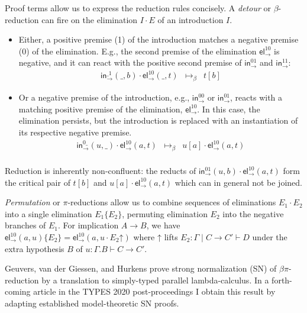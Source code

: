 \documentclass[a4paper]{easychair}
\newcommand{\tin}{\ensuremath{\mathsf{in}}}
\newcommand{\inn}[2]{\ensuremath{\tin_{#1}^{#2}}}
\newcommand{\tel}{\mathsf{el}}
\newcommand{\el}[2]{\ensuremath{\tel_{#1}^{#2}}}
\newcommand{\contract}[1][]{\mapsto_{#1}}
\newcommand{\up}{\mathord{\uparrow}}
\begin{document}
Proof terms allow us to express the reduction rules concisely.  A
\emph{detour} or $\beta$-reduction can fire on the elimination $I
\cdot E$ of an introduction $I$.
\begin{itemize}
\item
Either, a
positive premise (1) of the introduction matches a negative premise
(0) of the elimination.  E.g., the second
premise of the elimination $\el\to{10}$
is negative, and it can react with the
positive second premise of $\inn\to{01}$ and $\inn\to{11}$:
\[
\begin{array}{lll}
  \inn\to{\_1}(\_,b) \cdot \el\to{10}(\_,t)
    & \contract[\beta] &
  t[b]
\end{array}
\]

\item
Or a negative premise of the introduction, e.g., $\inn\to{00}$ or
$\inn\to{01}$, reacts with
a matching positive premise of the elimination, $\el\to{10}$.
In this case, the
elimination persists, but the introduction is replaced with an
instantiation of its respective negative premise.
\[
\begin{array}{lll}
  \inn\to{0\_}(u,\_) \cdot \el\to{10}(a,t)
    & \contract[\beta] &
  u[a] \cdot \el\to{10}(a,t)
\\
\end{array}
\]
\end{itemize}
Reduction is inherently non-confluent: the reducts of
$\inn\to{01}(u,b) \cdot \el\to{10}(a,t)$ form the critical pair
of $t[b]$ and  $u[a] \cdot \el\to{10}(a,t)$ which can in general not be
joined.

\emph{Permutation} or $\pi$-reductions allow us to combine sequences
of eliminations $E_1 \cdot E_2$ into a single elimination
$E_1\{E_2\}$, permuting elimination $E_2$ into the negative branches
of $E_1$.  For implication $A \to B$, we have $\el\to{10}(a,u) \{ E_2 \} =
\el\to{10}(a,u \cdot E_2 \up)$ where $\up$ lifts $E_2 : \Gamma \mid C
\to C' \vdash D$ under the extra hypothesis $B$ of $u : \Gamma.B \vdash
C \to C'$.

Geuvers, van der Giessen, and Hurkens
\citeyearpar{geuversGiessenHurkens:fundinf19} prove strong normalization (SN)
of $\beta\pi$-reduction by a translation to simply-typed parallel
lambda-calculus.  In a forth-coming article \citep{abel:types20post}
in the TYPES 2020
post-proceedings I obtain this result by adapting established
model-theoretic SN proofs.
\end{document}
